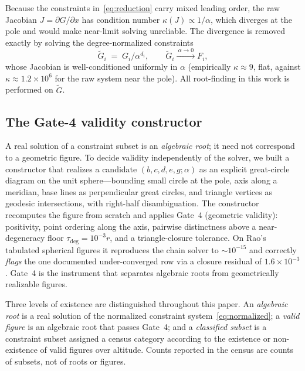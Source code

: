 \documentclass[11pt]{article}
\begin{document}
Because the constraints in~\eqref{eq:reduction} carry mixed leading order, the raw Jacobian $J=\partial G/\partial x$ has condition number $\kappa(J)\propto 1/\alpha$, which diverges at the pole and would make near-limit
solving unreliable. The divergence is removed exactly by solving the degree-normalized constraints
\begin{equation}
\widetilde{G}_i \;=\; G_i/\alpha^{d_i},
\qquad \widetilde{G}_i \xrightarrow{\ \alpha\to 0\ } F_i ,
\label{eq:normalized}
\end{equation}
whose Jacobian is well-conditioned uniformly in $\alpha$ (empirically
$\kappa\approx 9$, flat, against $\kappa\approx 1.2\times 10^{6}$ for the raw
system near the pole). All root-finding in this work is performed on
$\widetilde{G}$.

\subsection{The Gate-4 validity constructor}
\label{sec:gate4}

A real solution of a constraint subset is an \emph{algebraic root}; it need not correspond to a geometric figure. To decide validity independently of the
solver, we built a constructor that realizes a candidate $(b,c,d,e,g;\alpha)$ as an explicit great-circle diagram on the unit sphere---bounding small circle at the pole, axis along a meridian, base lines as perpendicular great circles, and triangle vertices as geodesic intersections, with right-half disambiguation. The constructor recomputes the figure from scratch and applies Gate~4 (geometric validity): positivity, point ordering along the axis, pairwise distinctness above a near-degeneracy floor $\tau_{\deg}=10^{-3}r$, and a triangle-closure tolerance.
On Rao's tabulated spherical figures it reproduces the chain solver to
$\sim\!10^{-15}$ and correctly \emph{flags} the one documented under-converged row via a closure residual of $1.6\times10^{-3}$. Gate~4 is the instrument that separates algebraic roots from geometrically realizable figures.

Three levels of existence are distinguished throughout this paper. An
\emph{algebraic root} is a real solution of the normalized constraint
system~\eqref{eq:normalized}; a \emph{valid figure} is an algebraic root that
passes Gate~4; and a \emph{classified subset} is a constraint subset assigned a census category according to the existence or non-existence of valid figures over altitude. Counts reported in the census are counts of subsets, not of roots or figures.
\end{document}
